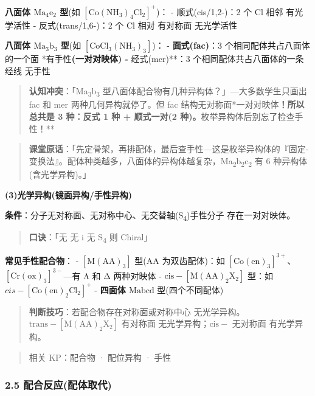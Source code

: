 \textbf{八面体 \(\mathrm{Ma_4e_2}\) 型}(如 \([\mathrm{Co(NH_3)_4Cl_2}]^+\))：
- 顺式(cis/1,2-)：2 个 Cl 相邻 \箭 有光学活性
- 反式(trans/1,6-)：2 个 Cl 相对 \箭 有对称面 \箭 无光学活性

\textbf{八面体 \(\mathrm{Ma_3b_3}\) 型}(如 \([\mathrm{CoCl_3(NH_3)_3}]\))：
- \textbf{面式(fac)}：3 个相同配体共占八面体的一个面 \箭 **有手性\textbf{(一对对映体)
- }经式(mer)**：3 个相同配体共占八面体的一条经线 \箭 无手性

\begin{quote}
\textbf{认知冲突}：「Ma\textsubscript{3}b\textsubscript{3} 型八面体配合物有几种异构体？」---大多数学生只画出 fac 和 mer 两种几何异构就停了。但 fac 结构无对称面*一对对映体\textbf{！所以总共是 3 种：反式 1 种 + 顺式一对(2 种)。}枚举异构体后别忘了检查手性！**
\end{quote}

\begin{quote}
\textbf{课堂原话}：「先定骨架，再排配体，最后查手性---这是枚举异构体的『固定-变换法』。配体种类越多，八面体的异构体越复杂，Ma\textsubscript{2}b\textsubscript{2}c\textsubscript{2} 有 6 种异构体(含光学异构)。」
\end{quote}

\textbf{(3)光学异构(镜面异构/手性异构)}

\textbf{条件}：分子无对称面、无对称中心、无交替轴(S\textsubscript{4})\箭 手性分子 \箭 存在一对对映体。

\begin{quote}
\textbf{口诀}：「无  无 i 无 S\textsubscript{4} 则 Chiral」
\end{quote}

\textbf{常见手性配合物}：
- \(\mathrm{[M(AA)_3]}\) 型(AA 为双齿配体)：如 \([\mathrm{Co(en)_3}]^{3+}\)、\([\mathrm{Cr(ox)_3}]^{3-}\)---有 Λ 和 Δ 两种对映体
- \(\mathrm{cis-[M(AA)_2X_2]}\) 型：如 \(cis-[\mathrm{Co(en)_2Cl_2}]^+\)
- \textbf{四面体 \(\mathrm{Mabcd}\)} 型(四个不同配体)

\begin{quote}
\textbf{判断技巧}：若配合物存在对称面或对称中心 \箭 无光学异构。\(\mathrm{trans-[M(AA)_2X_2]}\) 有对称面 \箭 无光学异构；\(\mathrm{cis-}\) 无对称面 \箭 有光学异构。
\end{quote}

\begin{quote}
相关 KP：配合物 · 配位异构 · 手性
\end{quote}

\subsubsection{2.5 配合反应(配体取代)}\label{ux914dux5408ux53cdux5e94ux914dux4f53ux53d6ux4ee3}

